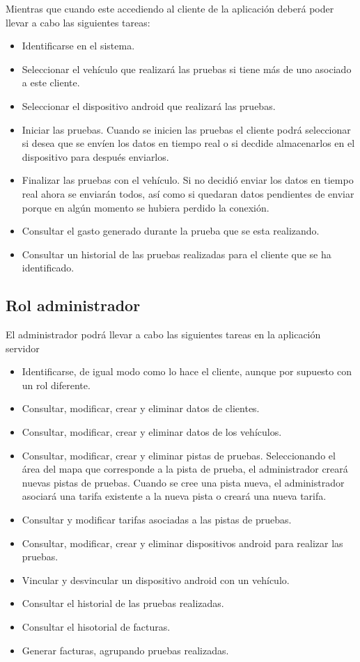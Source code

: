 \documentclass[spanish,a4paper,10pt]{article}
\begin{document}
Mientras que cuando este accediendo al cliente de la aplicación deberá poder llevar a cabo las siguientes tareas:
\begin{itemize}
 \item Identificarse en el sistema.
 \item Seleccionar el vehículo que realizará las pruebas si tiene más de uno asociado a este cliente. 
 \item Seleccionar el dispositivo android que realizará las pruebas.
 \item Iniciar las pruebas. Cuando se inicien las pruebas el cliente podrá seleccionar si desea que se envíen los datos en tiempo real o 
si decdide almacenarlos en el dispositivo para después enviarlos.
 \item Finalizar las pruebas con el vehículo. Si no decidió enviar los datos en tiempo real ahora se enviarán todos, así como si quedaran 
datos pendientes de enviar porque en algún momento se hubiera perdido la conexión. 
  \item Consultar el gasto generado durante la prueba que se esta realizando. 
  \item Consultar un historial de las pruebas realizadas para el cliente que se ha identificado.
\end{itemize}

\subsection{Rol administrador}

El administrador podrá llevar a cabo las siguientes tareas en la aplicación servidor
\begin{itemize}
 \item Identificarse, de igual modo como lo hace el cliente, aunque por supuesto con un rol diferente. 
 \item Consultar, modificar, crear y eliminar datos de clientes. 
 \item Consultar, modificar, crear y eliminar datos de los vehículos. 
 \item Consultar, modificar, crear y eliminar pistas de pruebas. Seleccionando el área del mapa que corresponde a la pista de prueba, el administrador creará nuevas pistas de pruebas. 
Cuando se cree una pista nueva, el administrador asociará una tarifa existente a la nueva pista o creará una nueva tarifa. 
 \item Consultar y modificar tarifas asociadas a las pistas de pruebas.
 \item Consultar, modificar, crear y eliminar dispositivos android para realizar las pruebas. 
 \item Vincular y desvincular un dispositivo android con un vehículo.
 \item Consultar el historial de las pruebas realizadas. 
 \item Consultar el hisotorial de facturas.
 \item Generar facturas, agrupando pruebas realizadas. 
\end{itemize}
\end{document}
